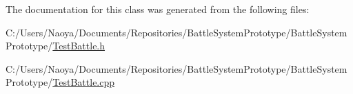The documentation for this class was generated from the following files\+:\begin{DoxyCompactItemize}
\item 
C\+:/\+Users/\+Naoya/\+Documents/\+Repositories/\+Battle\+System\+Prototype/\+Battle\+System\+Prototype/\hyperlink{_test_battle_8h}{Test\+Battle.\+h}\item 
C\+:/\+Users/\+Naoya/\+Documents/\+Repositories/\+Battle\+System\+Prototype/\+Battle\+System\+Prototype/\hyperlink{_test_battle_8cpp}{Test\+Battle.\+cpp}\end{DoxyCompactItemize}
